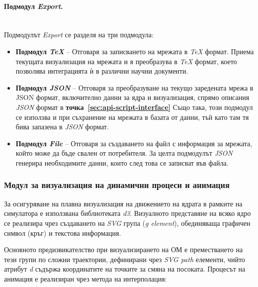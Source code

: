 \paragraph{Подмодул \textit{Export}.}
\mbox{}\\
Подмодулът \textit{Export} се разделя на три подмодула:
\begin{itemize}
	\item \textbf{Подмодул \textit{TeX}} -- Отговаря за записването на мрежата в \textit{TeX} формат. Приема текущата визуализация на мрежата и я преобразува в \textit{TeX} формат, което позволява интеграцията ѝ в различни научни документи.
	
	\item \textbf{Подмодул \textit{JSON}} -- Отговаря за преобразуване на текущо заредената мрежа в JSON формат, включително данни за ядра и визуализация, спрямо описания \textit{JSON} формат в \textbf{точка~\ref{sec:api-script-interface}} Също така, този подмодул се използва и при съхранение на мрежата в базата от данни, тъй като там тя бива запазена в \textit{JSON} формат.
	
	\item \textbf{Подмодул \textit{File}} -- Отговаря за създаването на файл с информация за мрежата, който може да бъде свален от потребителя. За целта подмодулът \textit{JSON} генерира необходимите данни, които след това се записват във файла.
\end{itemize}


\subsubsection{Модул за визуализация на динамични процеси и анимация}

\hspace*{2.5em}За осигуряване на плавна визуализация на движението на ядрата в рамките на симулатора е използвана библиотеката \textit{d3}. Визуалното представяне на всяко ядро се реализира чрез създаването на \textit{SVG} група (\textit{g element}), обединяваща графичен символ (кръг) и текстова информация.

Основното предизвикателство при визуализирането на ОМ е преместването на тези групи по сложни траектории, дефинирани чрез \textit{SVG path} елементи, чийто атрибут \textit{d} съдържа координатите на точките за смяна на посоката. Процесът на анимация е реализиран чрез метода на интерполация:

